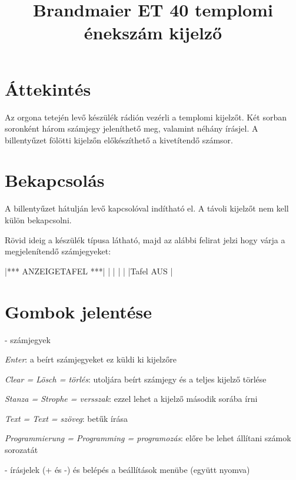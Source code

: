 \documentclass{article}
\begin{document}

\title{Brandmaier ET 40 templomi énekszám kijelző}
\date{}

\setlength{\droptitle}{-3cm}
\maketitle

\section*{Áttekintés}

Az orgona tetején levő készülék rádión vezérli a templomi kijelzőt. Két sorban soronként három számjegy jeleníthető meg, valamint néhány írásjel. A billentyűzet fölötti kijelzőn előkészíthető a kivetítendő számsor.

\section*{Bekapcsolás}

A billentyűzet hátulján levő kapcsolóval indítható el. A távoli kijelzőt nem kell külön bekapcsolni.



Rövid ideig a készülék típusa látható, majd az alábbi felirat jelzi hogy várja a megjelenítendő számjegyeket:

|*** ANZEIGETAFEL ***|
|                    |
|                    |
|Tafel AUS           |

\section*{Gombok jelentése}

- számjegyek

\keys{ } \emph{Enter}: a beírt számjegyeket ez küldi ki kijelzőre

 \emph{Clear = Lösch = törlés}: utoljára beírt számjegy és a teljes kijelző törlése

 \emph{Stanza = Strophe = versszak}: ezzel lehet a kijelző második sorába írni

 \emph{Text = Text = szöveg}: betűk írása

 \emph{Programmierung = Programming = programozás}: előre be lehet állítani számok sorozatát

\keys{{+}}-\keys{{-}} írásjelek (+ és -) és belépés a beállítások menübe (együtt nyomva)
\end{document}
